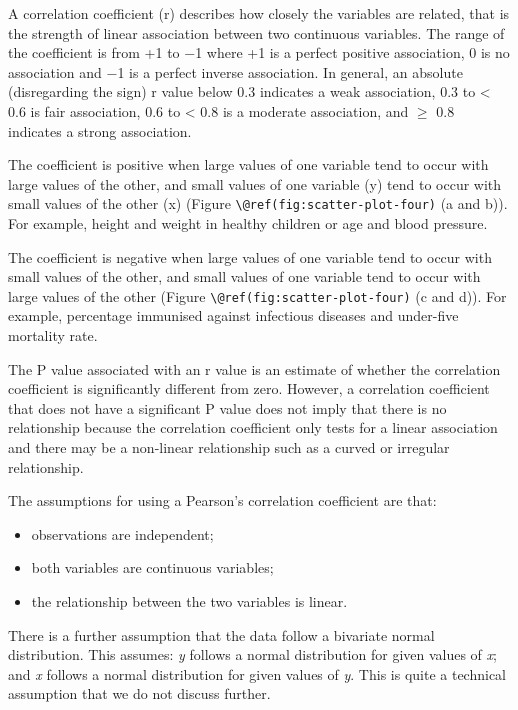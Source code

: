 \documentclass[
]{memoir}
\providecommand{\tightlist}{%
  \setlength{\itemsep}{0pt}\setlength{\parskip}{0pt}}
\begin{document}
A correlation coefficient (r) describes how closely the variables are related, that is the strength of linear association between two continuous variables. The range of the coefficient is from +1 to −1 where +1 is a perfect positive association, 0 is no association and −1 is a perfect inverse association. In general, an absolute (disregarding the sign) r value below 0.3 indicates a weak association, 0.3 to \textless{} 0.6 is fair association, 0.6 to \textless{} 0.8 is a moderate association, and \(\ge\) 0.8 indicates a strong association.

The coefficient is positive when large values of one variable tend to occur with large values of the other, and small values of one variable (y) tend to occur with small values of the other (x) (Figure \texttt{\textbackslash{}@ref(fig:scatter-plot-four)} (a and b)). For example, height and weight in healthy children or age and blood pressure.

The coefficient is negative when large values of one variable tend to occur with small values of the other, and small values of one variable tend to occur with large values of the other (Figure \texttt{\textbackslash{}@ref(fig:scatter-plot-four)} (c and d)). For example, percentage immunised against infectious diseases and under-five mortality rate.

The P value associated with an r value is an estimate of whether the correlation coefficient is significantly different from zero. However, a correlation coefficient that does not have a significant P value does not imply that there is no relationship because the correlation coefficient only tests for a linear association and there may be a non-linear relationship such as a curved or irregular relationship.

The assumptions for using a Pearson's correlation coefficient are that:

\begin{itemize}
\tightlist
\item
  observations are independent;
\item
  both variables are continuous variables;
\item
  the relationship between the two variables is linear.
\end{itemize}

There is a further assumption that the data follow a bivariate normal distribution. This assumes: \emph{y} follows a normal distribution for given values of \emph{x}; and \emph{x} follows a normal distribution for given values of \emph{y}. This is quite a technical assumption that we do not discuss further.
\end{document}
